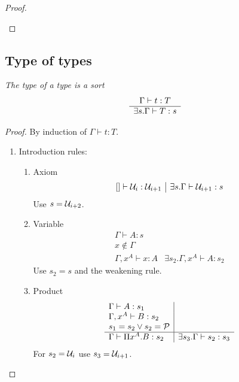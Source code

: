 \begin{theorem}
\begin{proof}
\begin{enumerate}
        \end{enumerate}
    \end{proof}
\end{theorem}






\subsection{Type of types}

\begin{theorem}
    \label{TypeOfTypes}
    \emph{The type of a type is a sort}
    $$
    \begin{array}{c} 
        \Gamma \vdash t: T
     \\ \hline 
        \exists s. \Gamma \vdash T : s
    \end{array}
    $$

    \begin{proof}
        By induction of $\Gamma \vdash t : T$.
        \begin{enumerate}
            \item Introduction rules:
            \begin{enumerate}
                \item Axiom
                $$
                \begin{array}{l|l}
                    [] \vdash {\cal U}_i : {\cal U}_{i+1}
                    &
                    \exists s. \Gamma \vdash {\cal U}_{i+1}: s
                \end{array}
                $$
                Use $s = {\cal U}_{i+2}$.

                \item Variable
                $$
                \begin{array}{l|l}
                    \Gamma \vdash A : s
                    \\
                    x \notin \Gamma
                    \\
                    \hline
                    \Gamma, x^A \vdash x: A
                    &
                    \exists s_2. \Gamma,x^A \vdash A: s_2
                \end{array}
                $$
                Use $s_2 = s$ and the weakening rule.

                \item Product
                $$
                \begin{array}{l|l}
                    \Gamma \vdash A : s_1
                    \\
                    \Gamma,x^A \vdash B: s_2
                    \\
                    s_1 = s_2 \lor s_2 = {\cal P}
                    \\
                    \hline
                    \Gamma \vdash \Pi x^A. B : s_2
                    &
                    \exists s_3. \Gamma \vdash s_2: s_3
                \end{array}
                $$
                For $s_2 = {\cal U}_i$ use $s_3 = {\cal U}_{i+1}$.


\end{enumerate}
\end{enumerate}
\end{proof}
\end{theorem}
